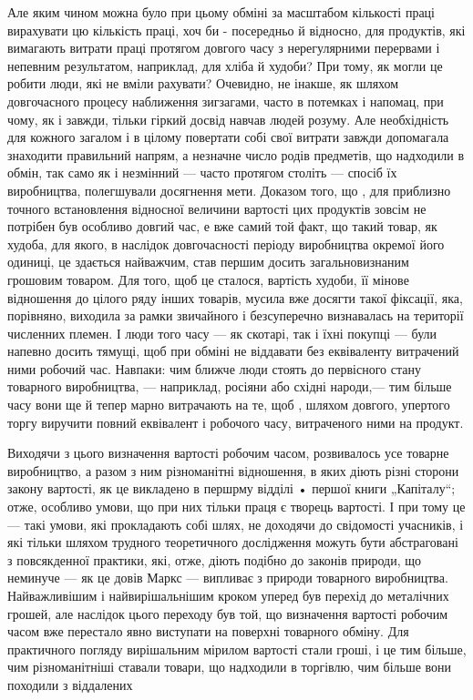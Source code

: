 Але яким чином можна було при цьому обміні за масштабом кількості праці вирахувати цю кількість праці, хоч би - посередньо й
відносно, для продуктів, які вимагають витрати праці протягом довгого часу з нерегулярними перервами і непевним результатом,
наприклад, для хліба й худоби? При тому, як могли це робити люди, які не вміли рахувати? Очевидно, не інакше, як шляхом
довгочасного процесу наближення зигзагами, часто в потемках і напомац, при чому, як і завжди, тільки гіркий досвід навчав
людей розуму. Але необхідність для кожного загалом і в цілому повертати собі свої витрати завжди допомагала знаходити
правильний напрям, а незначне число родів предметів, що надходили в обмін, так само як і незмінний — часто протягом століть
— спосіб їх виробництва, полегшували досягнення мети. Доказом того, що , для приблизно точного встановлення відносної
величини вартості цих продуктів зовсім не потрібен був особливо довгий час, е вже самий той факт, що такий товар, як худоба,
для якого, в наслідок довгочасності періоду виробництва окремої його одиниці, це здається найважчим, став першим досить
загальновизнаним грошовим товаром. Для того, щоб це сталося, вартість худоби, її мінове відношення до цілого ряду інших
товарів, мусила вже досягти такої фіксації, яка, порівняно, виходила за рамки звичайного і безсуперечно визнавалась на
території численних племен. І люди того часу — як скотарі, так і їхні покупці — були напевно досить тямущі, щоб при обміні
не віддавати без еквіваленту витрачений ними робочий час. Навпаки: чим ближче люди стоять до первісного стану товарного
виробництва, — наприклад, росіяни або східні народи,—  тим більше часу вони ще й тепер марно витрачають на те, щоб , шляхом
довгого, упертого торгу виручити повний еквівалент і робочого часу, витраченого ними на продукт.

Виходячи з цього визначення
вартості робочим часом, розвивалось усе товарне виробництво, а разом з ним різноманітні відношення, в яких діють різні
сторони закону вартості, як це викладено в першрму відділі • першої книги „Капіталу“; отже, особливо умови, що при них
тільки праця є творець вартості. І при тому це — такі умови, які прокладають собі шлях, не доходячи до свідомості учасників,
і які тільки шляхом трудного теоретичного дослідження можуть бути абстраговані з повсякденної практики, які, отже, діють
подібно до законів природи, що неминуче — як це довів Маркс — випливає з природи товарного виробництва. Найважливішим і
найвирішальнішим кроком уперед був перехід до металічних грошей, але наслідок цього переходу був той, що визначення вартості
робочим часом вже перестало явно виступати на поверхні товарного обміну. Для практичного погляду вирішальним мірилом
вартості стали гроші, і це тим більше, чим різноманітніші ставали товари, що надходили в торгівлю, чим більше вони походили
з віддалених
\parbreak{}  %
